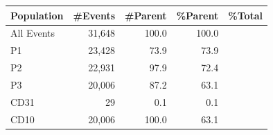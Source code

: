 \documentclass[UTF8,10pt,a4paper,fontset=fandol]{ctexart}
\newcommand{\fieldvalue}[1]{#1}
\begin{document}
\begin{center}
\small
\begin{tabularx}{0.58\textwidth}{@{}lrrrr@{}}
\hline
\multicolumn{1}{c}{Population} &
\multicolumn{1}{c}{\#Events} &
\multicolumn{1}{c}{\#Parent} &
\multicolumn{1}{c}{\%Parent} &
\multicolumn{1}{c}{\%Total} \\
\hline
All Events &
\fieldvalue{31,648} &
\fieldvalue{100.0} &
\fieldvalue{100.0} \\
P1 &
\fieldvalue{23,428} &
\fieldvalue{73.9} &
\fieldvalue{73.9} \\
P2 &
\fieldvalue{22,931} &
\fieldvalue{97.9} &
\fieldvalue{72.4} \\
P3 &
\fieldvalue{20,006} &
\fieldvalue{87.2} &
\fieldvalue{63.1} \\
CD31 &
\fieldvalue{29} &
\fieldvalue{0.1} &
\fieldvalue{0.1} \\
CD10 &
\fieldvalue{20,006} &
\fieldvalue{100.0} &
\fieldvalue{63.1} \\
\hline
\end{tabularx}
\end{center}

\vspace{0.75em}
\end{document}
